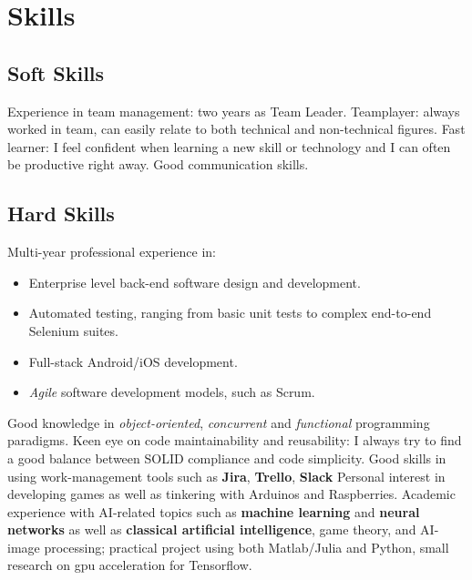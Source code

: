 \documentclass[letterpaper]{twentysecondcv} %
\begin{document}
\section{Skills}

\subsection{Soft Skills}
\small
Experience in team management: two years as Team Leader.\newline
Teamplayer: always worked in team, can easily relate to both technical and non-technical figures.  \newline
Fast learner: I feel confident when learning a new skill or technology and I can often be productive right away.\newline
Good communication skills. \newline

\subsection{Hard Skills}
\small
Multi-year professional experience in: \begin{itemize}[noitemsep,nolistsep]
	\item Enterprise level back-end software design and development.
	\item Automated testing, ranging from basic unit tests to complex end-to-end Selenium suites.
	\item Full-stack Android/iOS development.
	\item \textit{Agile} software development models, such as Scrum.
\end{itemize}
Good knowledge in \textit{object-oriented}, \textit{concurrent} and \textit{functional} programming paradigms.\newline
Keen eye on code maintainability and reusability: I always try to find a good balance between SOLID compliance and code simplicity.\newline
Good skills in using work-management tools such as \textbf{Jira}, \textbf{Trello}, \textbf{Slack}\newline
Personal interest in developing games as well as tinkering with Arduinos and Raspberries. \newline
Academic experience with AI-related topics such as \textbf{machine learning} and \textbf{neural networks} as well as \textbf{classical artificial intelligence}, game theory, and AI-image processing; practical project using both Matlab/Julia and Python, small research on gpu acceleration for Tensorflow. \newline
\end{document}
